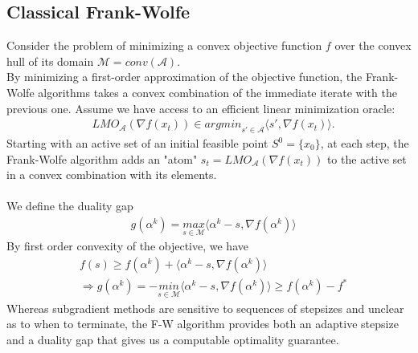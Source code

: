 \documentclass{article}
\begin{document}
\subsection{Classical Frank-Wolfe}
Consider the problem of minimizing a convex objective function $f$ over the convex hull of its domain $\mathcal{M}= conv(\mathcal{A})$.\\
By minimizing a first-order approximation of the objective function, the Frank-Wolfe algorithms takes a convex combination of the immediate iterate with the previous one. Assume we have access to an efficient linear minimization oracle:
\begin{equation*}
\begin{aligned}
    &LMO_{\mathcal{A}}(\nabla f(x_{t}))\in \textit{argmin}_{s\prime\in\mathcal{A}}\langle s\prime, \nabla f(x_{t})\rangle.
\end{aligned}    
\end{equation*}
Starting with an active set of an initial feasible point $S^{0}= \{x_{0}\}$, at each step, the Frank-Wolfe algorithm adds an "atom" $s_{t}= LMO_{\mathcal{A}}(\nabla f(x_{t}))$ to the active set in a convex combination with its elements.\\
\\
We define the duality gap
\begin{equation*}
\begin{aligned}
    &g(\alpha^{k})= \underset{s\in\mathcal{M}}{\textit{max}}\langle \alpha^{k}-s, \nabla f(\alpha^{k})\rangle
\end{aligned}
\end{equation*}
By first order convexity of the objective, we have
\begin{equation*}
\begin{aligned}
    &f(s)\geq f(\alpha^{k})+ \langle \alpha^{k}-s, \nabla f(\alpha^{k})\rangle\\
    &\Longrightarrow g(\alpha^{k})= -\underset{s\in\mathcal{M}}{\textit{min}}\langle \alpha^{k}-s, \nabla f(\alpha^{k})\rangle \geq f(\alpha^{k})- f^{*}
\end{aligned}
\end{equation*}
Whereas subgradient methods are sensitive to sequences of stepsizes and unclear as to when to terminate, the F-W algorithm provides both an adaptive stepsize and a duality gap that gives us a computable optimality guarantee.
\end{document}
